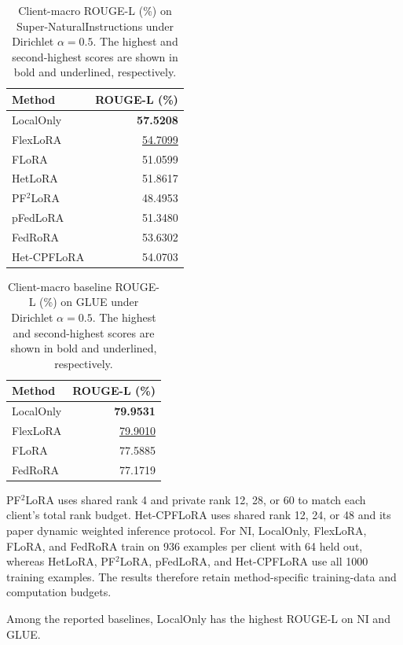 \begin{table}[t]
\centering
\small
\setlength{\tabcolsep}{4pt}
\caption{Client-macro ROUGE-L (\%) on Super-NaturalInstructions under Dirichlet $\alpha=0.5$.
The highest and second-highest scores are shown in bold and underlined, respectively.}
\label{tab:exp-ni-dir05}
\begin{tabular}{lr}
\toprule
\textbf{Method} & \textbf{ROUGE-L (\%)} \\
\midrule
LocalOnly                          & \textbf{57.5208} \\
FlexLoRA                           & \underline{54.7099} \\
FLoRA                              & 51.0599 \\
HetLoRA                            & 51.8617 \\
PF$^2$LoRA                          & 48.4953 \\
pFedLoRA                           & 51.3480 \\
FedRoRA                            & 53.6302 \\
Het-CPFLoRA                        & 54.0703 \\
\bottomrule
\end{tabular}
\end{table}

\begin{table}[t]
\centering
\small
\setlength{\tabcolsep}{4pt}
\caption{Client-macro baseline ROUGE-L (\%) on GLUE under Dirichlet $\alpha=0.5$.
The highest and second-highest scores are shown in bold and underlined, respectively.}
\label{tab:exp-glue-dir05}
\begin{tabular}{lr}
\toprule
\textbf{Method} & \textbf{ROUGE-L (\%)} \\
\midrule
LocalOnly                          & \textbf{79.9531} \\
FlexLoRA                           & \underline{79.9010} \\
FLoRA                              & 77.5885 \\
FedRoRA                            & 77.1719 \\
\bottomrule
\end{tabular}
\end{table}

PF$^2$LoRA uses shared rank 4 and private rank 12, 28, or 60 to match each client's total rank budget.
Het-CPFLoRA uses shared rank 12, 24, or 48 and its paper dynamic weighted inference protocol.
For NI, LocalOnly, FlexLoRA, FLoRA, and FedRoRA train on 936 examples per client with 64 held out, whereas HetLoRA, PF$^2$LoRA, pFedLoRA, and Het-CPFLoRA use all 1000 training examples.
The results therefore retain method-specific training-data and computation budgets.

Among the reported baselines, LocalOnly has the highest ROUGE-L on NI and GLUE.
